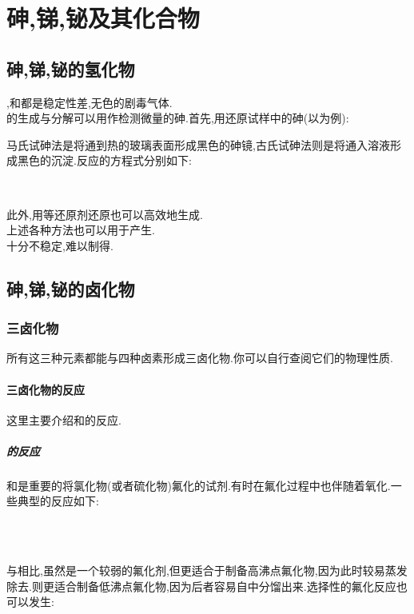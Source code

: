 \documentclass{ctexart}
\begin{document}
\section{砷,锑,铋及其化合物}
\subsection{砷,锑,铋的氢化物}
,和都是稳定性差,无色的剧毒气体.\\
\indent {}的生成与分解可以用作检测微量的砷.首先,用还原试样中的砷(以为例):
\begin{center}
\end{center}
马氏试砷法是将通到热的玻璃表面形成黑色的砷镜,古氏试砷法则是将通入溶液形成黑色的沉淀.反应的方程式分别如下:
\begin{center}
    \\
\end{center}
\indent 此外,用等还原剂还原也可以高效地生成.\\
\indent 上述各种方法也可以用于产生.\\
\indent {}十分不稳定,难以制得.
\subsection{砷,锑,铋的卤化物}
\subsubsection{三卤化物}
所有这三种元素都能与四种卤素形成三卤化物.你可以自行查阅它们的物理性质.
\paragraph{三卤化物的反应}
这里主要介绍和的反应.
\subparagraph{的反应}
和是重要的将氯化物(或者硫化物)氟化的试剂.有时在氟化过程中也伴随着氧化.一些典型的反应如下:
\begin{center}
    \\
    \\
\end{center}
与相比,虽然是一个较弱的氟化剂,但更适合于制备高沸点氟化物,因为此时较易蒸发除去.则更适合制备低沸点氟化物,因为后者容易自中分馏出来.选择性的氟化反应也可以发生:
\begin{center}
\end{center}
\end{document}
